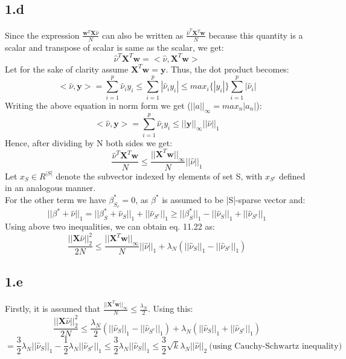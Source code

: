 \documentclass[12pt]{article}
\begin{document}
\subsection*{1.d}
Since the expression $\frac{\boldsymbol{w}^T\boldsymbol{X}\hat{\nu}}{N}$ can also be written as $\frac{\hat{\nu}^T\boldsymbol{X}^T\boldsymbol{w}}{N}$ because this quantity is a scalar and transpose of scalar is same as the scalar, we get:
\begin{equation*}
    \hat{\nu}^T\boldsymbol{X}^T\boldsymbol{w} = <\hat{\nu}, \boldsymbol{X}^T\boldsymbol{w}>
\end{equation*}
Let for the sake of clarity assume $\boldsymbol{X}^T\boldsymbol{w} = \boldsymbol{y}$. Thus, the dot product becomes:
\begin{equation*}
    <\hat{\nu}, \boldsymbol{y}> = \sum_{i=1}^{p}\hat{\nu}_iy_i \leq \sum_{i=1}^{p}|\hat{\nu}_iy_i| \leq max_i\{|y_i|\}\sum_{i=1}^{p}|\hat{\nu}_i|
\end{equation*}
Writing the above equation in norm form we get ($||a||_\infty = max_n{|a_n|}$):
\begin{equation*}
    <\hat{\nu}, \boldsymbol{y}> = \sum_{i=1}^{p}\hat{\nu}_iy_i  \leq ||\boldsymbol{y}||_\infty||\hat{\nu}||_1
\end{equation*}
Hence, after dividing by N both sides we get:
\begin{equation*}
    \frac{\hat{\nu}^T\boldsymbol{X}^T\boldsymbol{w}}{N} \leq \frac{||\boldsymbol{X}^T\boldsymbol{w}||_\infty}{N}||\hat{\nu}||_1
\end{equation*}
Let $x_S \in  R^{|S|}$ denote the subvector indexed by elements of set S, with $x_{S^c}$ defined in an analogous manner.\\
For the other term we have $\beta^*_{S_c} = 0$, as $\beta^*$ is assumed to be |S|-sparse vector and:
\begin{equation*}
    ||\beta^*+\hat{\nu}||_1 = ||\beta^*_{S}+\hat{\nu}_{S}||_1+||\hat{\nu}_{S^c}||_1 \geq ||\beta^*_{S}||_1-||\hat{\nu}_{S}||_1+||\hat{\nu}_{S^c}||_1
\end{equation*}
Using above two inequalities, we can obtain eq. 11.22 as:
\begin{equation*}
    \frac{||\boldsymbol{X}\hat{\nu}||^2_2}{2N}\leq \frac{||\boldsymbol{X}^T\boldsymbol{w}||_\infty}{N}||\hat{\nu}||_1 + \lambda_N(||\hat{\nu}_{S}||_1-||\hat{\nu}_{S^c}||_1)
\end{equation*}
\subsection*{1.e}
Firstly, it is assumed that $\frac{||\boldsymbol{X}^T\boldsymbol{w}||_\infty}{N} \leq \frac{\lambda_N}{2}$. Using this:
\begin{equation*}
    \frac{||\boldsymbol{X}\hat{\nu}||^2_2}{2N} \leq \frac{\lambda_N}{2}(||\hat{\nu}_{S}||_1-||\hat{\nu}_{S^c}||_1) + \lambda_N(||\hat{\nu}_{S}||_1+||\hat{\nu}_{S^c}||_1)  
\end{equation*}
\begin{equation*}
    = \frac{3}{2}\lambda_N||\hat{\nu}_{S}||_1-\frac{1}{2}\lambda_N||\hat{\nu}_{S^c}||_1 \leq \frac{3}{2}\lambda_N||\hat{\nu}_{S}||_1 \leq \frac{3}{2}\sqrt{k}\lambda_N||\hat{\nu}||_2 \ \textrm{(using Cauchy-Schwartz inequality)}
\end{equation*}
\end{document}
